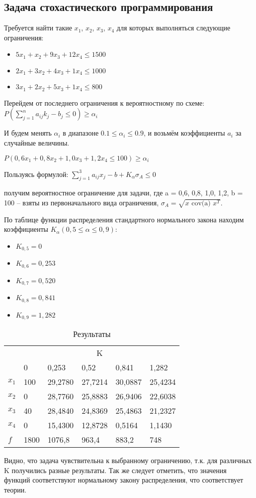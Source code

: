\subsection{Задача стохастического программирования}

Требуется найти такие $x_1$, $x_2$, $x_3$, $x_4$ для которых выполняться следующие ограничения:
\begin{itemize}
\item $5x_1+x_2+9x_3+12x_4 \leq 1500$
\item $2x_1+3x_2+4x_3+1x_4 \leq 1000$
\item $3x_1+2x_2+5x_3+1x_4 \leq 800$
\end{itemize}

Перейдем от последнего ограничения к вероятностному по схеме:
$P(\sum\limits_{j=1}^n a_{ij}k_j-b_j\leq0)\geq\alpha_i$
	
И будем менять $\alpha_i$ в диапазоне $0.1 \leq \alpha_i \leq 0.9$, и возьмём коэффициенты $a_i$ за случайные величины.

$P(0,6x_1 + 0,8x_2 + 1,0x_3 + 1,2x_4 \leq 100) \geq \alpha_i$

Пользуясь формулой:
$\sum\limits_{j=1}^3 a_{ij} x_j - b + K_\alpha \sigma_A \leq 0$

получим вероятностное ограничение для задачи, где  a = {0,6, 0,8, 1,0, 1,2}, b = 100 -- взяты из первоначального вида ограничения, $\sigma_A = \sqrt{x \text{ cov(a) } x^T}$.

По таблице функции распределения стандартного нормального закона находим коэффициенты $K_\alpha (0,5 \leq  \alpha \leq  0,9)$:
\begin{itemize}
\item $K_{0,5} = 0$
\item $K_{0,6} = 0,253$
\item $K_{0,7} = 0,520$
\item $K_{0,8} = 0,841$
\item $K_{0,9} = 1,282$
\end{itemize}





\begin{table}[htb]
	\begin{tabularx}{\textwidth}{|X|X|X|X|X|X|}
	\hline 
	\multirow{2}{*}{} & \multicolumn{5}{c|}{K} \\ 
	\hhline{~-----}
	{} & 0 & 0,253 & 0,52 & 0,841 & 1,282 \\ 
	\hline 
	$x_1$ & 100 & 29,2780 & 27,7214 & 30,0887 & 25,4234 \\ 
	\hline 
	$x_2$ & 0 & 28,7760 & 25,8883 & 26,9406 & 22,6038 \\ 
	\hline 
	$x_3$ & 40 & 28,4840 & 24,8369 & 25,4863 & 21,2327 \\ 
	\hline 
	$x_4$ & 0 & 15,4300 & 12,8728 & 0,5164 & 1,1430 \\ 
	\hline 
	$f$ & 1800 & 1076,8 & 963,4 & 883,2 & 748 \\
	\hline 
	\end{tabularx} 
\caption{Результаты}
\end{table}

Видно, что задача чувствительна к выбранному ограничению, т.к. для различных K получились разные результаты. Так же следует отметить, что значения функций соответствуют нормальному закону распределения, что соответствует теории.